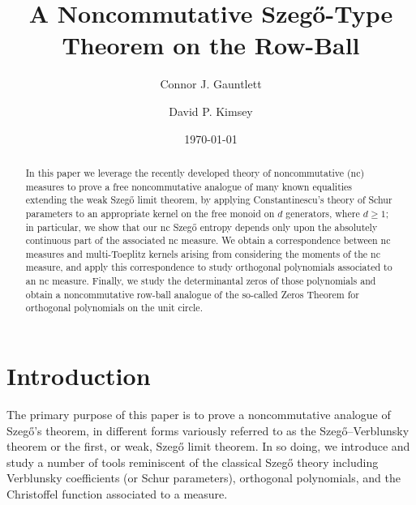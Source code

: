 \documentclass[11pt,reqno]{amsart}
\title{A Noncommutative Szeg\H{o}-Type Theorem on the Row-Ball}
\date{\today}
\author[C. J. Gauntlett]{Connor J. Gauntlett}
\author[D. P. Kimsey]{David P. Kimsey}
\theoremstyle{definition}
\numberwithin{equation}{section}
\begin{document}
\begin{abstract}
    In this paper we leverage the recently developed theory of noncommutative (nc) measures to prove a free noncommutative analogue of many known equalities extending the weak Szeg\H{o} limit theorem, by applying Constantinescu's theory of Schur parameters to an appropriate kernel on the free monoid on \(d\) generators, where \(d \geq 1\); in particular, we show that our nc Szeg\H{o} entropy depends only upon the absolutely continuous part of the associated nc measure. We obtain a correspondence between nc measures and multi-Toeplitz kernels arising from considering the moments of the nc measure, and apply this correspondence to study orthogonal polynomials associated to an nc measure. Finally, we study the determinantal zeros of those polynomials and obtain a noncommutative row-ball analogue of the so-called Zeros Theorem for orthogonal polynomials on the unit circle.
\end{abstract}

\maketitle

\tableofcontents

\section{Introduction}

The primary purpose of this paper is to prove a noncommutative analogue of Szeg\H{o}'s theorem, in different forms variously referred to as the Szeg\H{o}--Verblunsky theorem or the first, or weak, Szeg\H{o} limit theorem. In so doing, we introduce and study a number of tools reminiscent of the classical Szeg\H{o} theory including Verblunsky coefficients (or Schur parameters), orthogonal polynomials, and the Christoffel function associated to a measure.
\end{document}
